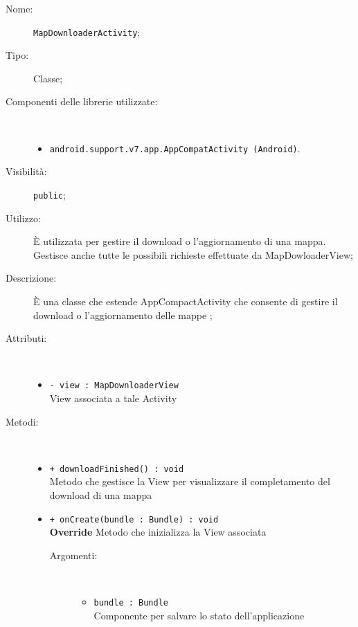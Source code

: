 \documentclass[../DefinizioneDiProdotto.tex]{subfiles}
\begin{document}
\begin{description}
	\item[Nome:] \texttt{MapDownloaderActivity};
	\item[Tipo:] Classe;
	\item[Componenti delle librerie utilizzate:] \
	\begin{itemize}
		\item \texttt{android.support.v7.app.AppCompatActivity (Android)}.
		
	\end{itemize}
	\item[Visibilità:] \texttt{public};
	\item[Utilizzo:] È utilizzata per gestire il download o l'aggiornamento di una mappa. Gestisce anche tutte le possibili richieste effettuate da MapDowloaderView;
	\item[Descrizione:] È una classe che estende AppCompactActivity che consente di gestire il download o l'aggiornamento delle mappe
	;
	\item[Attributi:] \
	\begin{itemize}
		\item \texttt{- view : MapDownloaderView}\\
		View associata a tale Activity
		
	\end{itemize}
	\item[Metodi:] \
	\begin{itemize}
		\item \texttt{+ downloadFinished() : void}\\
		Metodo che gestisce la View per visualizzare il completamento del download di una mappa
		\item \texttt{+ onCreate(bundle : Bundle) : void}\\
		\textbf{Override} Metodo che inizializza la View associata
		\begin{description}
			\item[Argomenti:] \
			\begin{itemize}
				\item \texttt{bundle : Bundle}\\
				Componente per salvare lo stato dell'applicazione\end{itemize}
		\end{description}
	\end{itemize}
\end{description}
\end{document}
